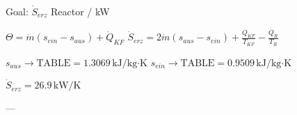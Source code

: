 Goal: \( \dot{S}_{erz} \) Reactor / kW  

\( \Theta = \dot{m} (s_{ein} - s_{aus}) + \dot{Q}_{KF} \)  
\( \dot{S}_{erz} = 2 \dot{m} (s_{aus} - s_{ein}) + \frac{\dot{Q}_{KF}}{T_{KF}} - \frac{\dot{Q}_R}{T_R} \)  

\( s_{aus} \rightarrow \text{TABLE} = 1.3069 \, \text{kJ/kg·K} \)  
\( s_{ein} \rightarrow \text{TABLE} = 0.9509 \, \text{kJ/kg·K} \)  

\( \dot{S}_{erz} = 26.9 \, \text{kW/K} \)  

---